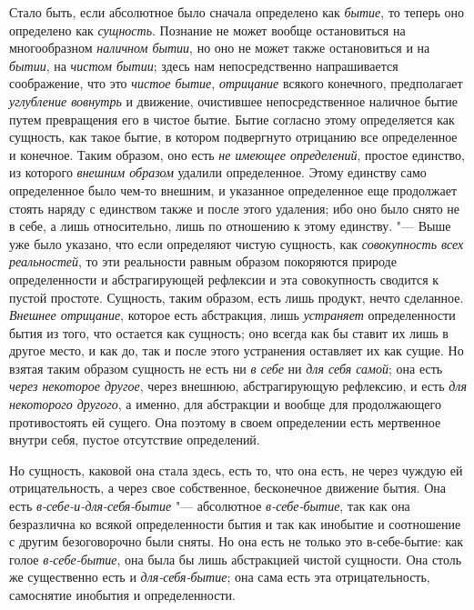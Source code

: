 Стало быть, если абсолютное было сначала определено как
{\em бытие}, то теперь оно определено как
{\em сущность}. Познание не может вообще остановиться
на многообразном {\em наличном бытии}, но оно не может
также остановиться и на {\em бытии}, на
{\em чистом бытии}; здесь нам непосредственно
напрашивается соображение, что это {\em чистое бытие},
{\em отрицание} всякого конечного, предполагает
{\em углубление вовнутрь} и движение, очистившее
непосредственное наличное бытие путем превращения его в чистое бытие. Бытие
согласно этому определяется как сущность, как такое бытие, в котором
подвергнуто отрицанию все определенное и конечное. Таким образом, оно есть
{\em не имеющее определений}, простое единство, из
которого {\em внешним образом} удалили определенное.
Этому единству само определенное было чем-то внешним, и указанное
определенное еще продолжает стоять наряду с единством также и после этого
удаления; ибо оно было снято не в себе, а лишь относительно, лишь по
отношению к этому единству. "--- Выше
уже было указано, что если определяют чистую сущность, как
{\em совокупность всех реальностей}, то эти реальности
равным образом покоряются природе определенности и абстрагирующей рефлексии
и эта совокупность сводится к пустой простоте. Сущность, таким образом,
есть лишь продукт, нечто сделанное. {\em Внешнее
отрицание}, которое есть абстракция, лишь
{\em устраняет} определенности бытия из того, что
остается как сущность;
оно
всегда как бы ставит их лишь в другое место, и как до, так и после этого
устранения оставляет их как сущие. Но взятая таким образом сущность не есть
ни {\em в себе} ни {\em для себя
самой}; она есть {\em через некоторое другое}, через
внешнюю, абстрагирующую рефлексию, и есть {\em для
некоторого другого}, а именно, для абстракции и вообще для продолжающего
противостоять ей сущего. Она поэтому в своем определении есть мертвенное
внутри себя, пустое отсутствие определений.

Но сущность, каковой она стала здесь, есть то, что она есть, не через чуждую
ей отрицательность, а через свое собственное, бесконечное движение бытия.
Она есть {\em в-себе-и-для-себя-бытие} "--- абсолютное
{\em в-себе-бытие}, так как она безразлична ко всякой
определенности бытия и так как инобытие и соотношение с другим
безоговорочно были сняты. Но она есть не только это в-себе-бытие: как голое
{\em в-себе-бытие}, она была бы лишь абстракцией чистой
сущности. Она столь же существенно есть и
{\em для-себя-бытие}; она сама есть эта
отрицательность, самоснятие инобытия и определенности.

